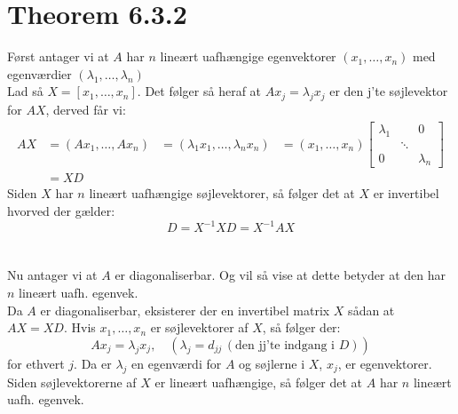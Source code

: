 \documentclass[a4paper,oneside,article]{memoir}
\begin{document}
	\section{Theorem 6.3.2}
	Først antager vi at $A$ har $n$ lineært uafhængige 
	egenvektorer $(x_1,\dots,x_n)$ med egenværdier 
	$(\lambda_1,\dots,\lambda_n)$\\
	Lad så $X=[x_1,\dots,x_n]$. Det følger så heraf at
	$Ax_j=\lambda_jx_j$ er den j'te søjlevektor for
	$AX$, derved får vi:
	\begin{align*}
	AX&=(Ax_1,\dots,Ax_n)
	&=(\lambda_1x_1,\dots,\lambda_nx_n)
	&=(x_1,\dots,x_n)\begin{bmatrix}
	\lambda_1 & & 0\\
 & \ddots & \\
 0 & & \lambda_n
	\end{bmatrix}\\
	&=XD
	\end{align*}
	Siden $X$ har $n$ lineært uafhængige søjlevektorer,
	så følger det at $X$ er invertibel hvorved der gælder:
	$$D=X^{-1}XD=X^{-1}AX$$
	\\
	\\
	Nu antager vi at $A$ er diagonaliserbar. Og vil så vise
	at dette betyder at den har $n$ lineært uafh. egenvek.\\
	Da $A$ er diagonaliserbar, eksisterer der en invertibel
	matrix $X$ sådan at $AX=XD$. Hvis $x_1,\dots,x_n$ er 
	søjlevektorer af $X$, så følger der:
	$$Ax_j=\lambda_j x_j, \quad (\lambda_j = d_{jj}\, (\text{den jj'te indgang i }D))$$
	for ethvert $j$. Da er $\lambda_j$ en egenværdi for $A$
	og søjlerne i $X$, $x_j$, er egenvektorer. Siden søjlevektorerne af $X$
	er lineært uafhængige, så følger det at $A$ har $n$ lineært
	uafh. egenvek.
	
\end{document}
